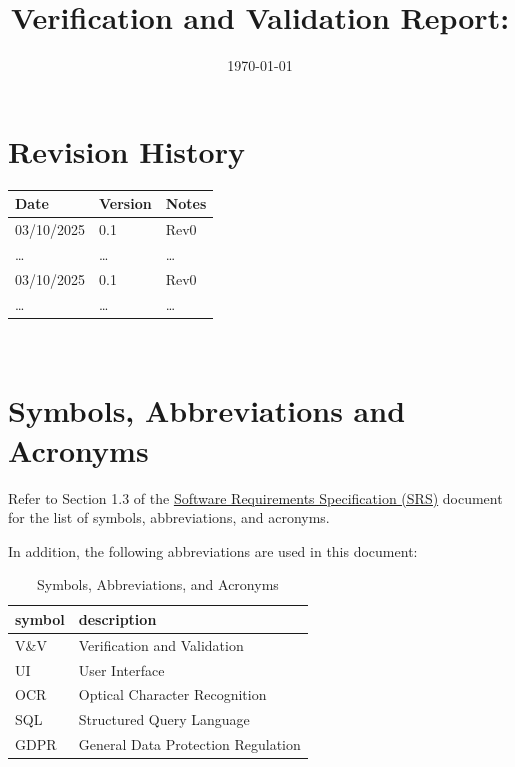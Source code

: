 \documentclass[12pt, titlepage]{article}
\begin{document}
\title{Verification and Validation Report: \progname} 
\author{\authname}
\date{\today}
	
\maketitle


\section{Revision History}

\begin{tabularx}{\textwidth}{p{3cm}p{2cm}X}
\toprule {\bf Date} & {\bf Version} & {\bf Notes}\\
\midrule
03/10/2025 & 0.1 & Rev0\\
\ldots & \ldots & \ldots\\
03/10/2025 & 0.1 & Rev0\\
\ldots & \ldots & \ldots\\
\bottomrule
\end{tabularx}

~\newpage

\section{Symbols, Abbreviations and Acronyms}


Refer to Section 1.3 of the
\href{https://github.com/PlutosCapstone/Plutos/blob/main/docs/SRS/SRS.pdf}{Software
Requirements Specification (SRS)} document for the list of symbols,
abbreviations, and acronyms.


In addition, the following abbreviations are used in this document:\\

\renewcommand{\arraystretch}{1.2}
\begin{table}[h!]
\caption{Symbols, Abbreviations, and Acronyms}
\begin{tabularx}{\textwidth}{l l}
  \toprule		
  \textbf{symbol} & \textbf{description}\\
  \midrule 
  V\&V & Verification and Validation\\
  UI & User Interface\\
  OCR & Optical Character Recognition\\
  SQL & Structured Query Language\\
  GDPR & General Data Protection Regulation\\
  \bottomrule
\end{tabularx}
\end{table}
\end{document}
